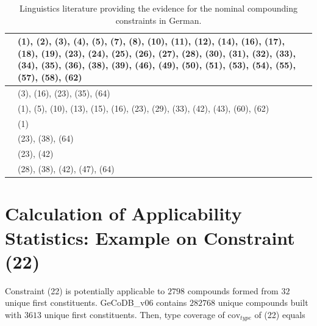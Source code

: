 \documentclass[10pt, a4paper]{article}
\begin{document}
\begin{table}[!ht]
\begin{center}
\begin{tabularx}{\columnwidth}{|X|X|}
      \hline
      \citet[chapter A.5]{ortner_mueller-bollhagen_1991} & (1), (2), (3), (4), (5), (7), (8), (10), (11), (12), (14), (16), (17), (18), (19), (23), (24), (25), (26), (27), (28), (30), (31), (32), (33), (34), (35), (36), (38), (39), (46), (49), (50), (51), (53), (54), (55), (57), (58), (62) \\

      \hline
      \citep[chapter 8.1]{schaefer_2018}        & (3), (16), (23), (35), (64) \\

      \hline
      \citet{schaefer_pankratz_2018}            & (1), (5), (10), (13), (15), (16), (23), (29), (33), (42), (43), (60), (62) \\

      \hline
      \citet{schluecker_2012}                   & (1) \\

      \hline
      \citet{schluecker_2023}                   & (23), (38), (64) \\

      \hline
      \citet{wegener_2003}                      & (23), (42) \\

      \hline
      \citet{wegener_2005}                      & (28), (38), (42), (47), (64) \\
      \hline

\end{tabularx}
\end{center}

\vspace{-0.5em}

\caption{Linguistics literature providing the evidence for the nominal compounding constraints in German.}
\label{tab_constr_prop}

\vspace{-2.5em}
 
\end{table}


\section{Calculation of Applicability Statistics: Example on Constraint (22)}
\label{22_calc}

Constraint (22) is potentially applicable to $2798$ compounds formed from $32$ unique first constituents. GeCoDB\_v06 contains $282768$ unique compounds built with $3613$ unique first constituents. Then, type coverage of $\text{cov}_{type}$ of (22) equals
\end{document}
